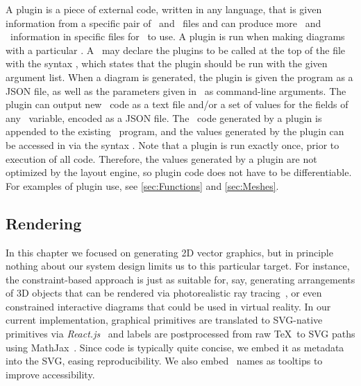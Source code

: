 A plugin is a piece of external code, written in any language, that is given information from a specific pair of \Substance\ and \Style\ files and can produce more \Substance\ and \Style\ information in specific files for \Penrose\ to use. A plugin is run when making diagrams with a particular \Style. A \Style\ may declare the plugins to be called at the top of the file with the syntax \mbox{,} which states that the plugin  should be run with the given argument list. When a diagram is generated, the plugin is given the \Substance{} program as a JSON file, as well as the parameters given in \Style\ as command-line arguments. The plugin can output new \Substance\ code as a text file and/or a set of values for the fields of any \Substance\ variable, encoded as a JSON file. The \Substance\ code generated by a plugin is appended to the existing \Substance\ program, and the values generated by the plugin can be accessed in \Style{} via the syntax . Note that a plugin is run exactly once, prior to execution of all \Penrose{} code. Therefore, the values generated by a plugin are not optimized by the layout engine, so plugin code does not have to be differentiable. For examples of plugin use, see \cref{sec:Functions} and \cref{sec:Meshes}.


\subsection{Rendering}
\label{sec:Rendering}

In this chapter we focused on generating 2D vector graphics, but in principle nothing about our system design limits us to this particular target.  For instance, the constraint-based approach is just as suitable for, say, generating arrangements of 3D objects that can be rendered via photorealistic ray tracing~\cite{Pharr:2016:PBR}, or even constrained interactive diagrams that could be used in virtual reality.  In our current implementation, graphical primitives are translated to SVG-native primitives via \emph{React.js}~\cite{Facebook:2020:RJS} and labels are postprocessed from raw \TeX\ to SVG paths using MathJax~\cite{Cervone:2012:MJ}.  Since \Penrose{} code is typically quite concise, we embed it as metadata into the SVG, easing reproducibility.  We also embed \Substance\ names as tooltips to improve accessibility.

